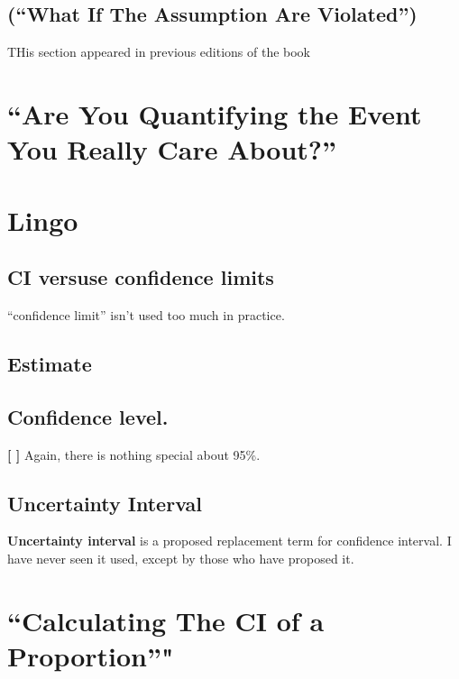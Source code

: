 \documentclass[]{book}
\theoremstyle{definition}
\theoremstyle{definition}
\theoremstyle{definition}
\theoremstyle{remark}
\begin{document}
\subsection{\texorpdfstring{(``What If The Assumption Are
Violated'')}{(What If The Assumption Are Violated)}}\label{what-if-the-assumption-are-violated}

THis section appeared in previous editions of the book

\section{\texorpdfstring{``Are You Quantifying the Event You Really Care
About?''}{Are You Quantifying the Event You Really Care About?}}\label{are-you-quantifying-the-event-you-really-care-about}

\section{Lingo}\label{lingo-1}

\subsection{CI versuse confidence
limits}\label{ci-versuse-confidence-limits}

``confidence limit'' isn't used too much in practice.

\subsection{Estimate}\label{estimate}

\subsection{Confidence level.}\label{confidence-level.}

\textbf{{[} {]}} Again, there is nothing special about 95\%.

\subsection{Uncertainty Interval}\label{uncertainty-interval}

\textbf{Uncertainty interval} is a proposed replacement term for
confidence interval. I have never seen it used, except by those who have
proposed it.

\section{\texorpdfstring{``Calculating The CI of a
Proportion''"}{Calculating The CI of a Proportion"}}\label{calculating-the-ci-of-a-proportion}
\end{document}
